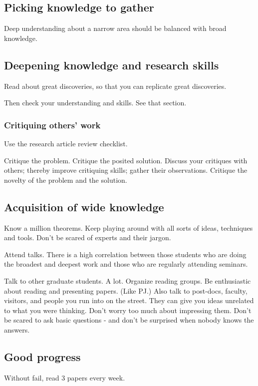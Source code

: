 \documentclass[oneside, article]{memoir}
\begin{document}
\subsection{Picking knowledge to gather}
Deep understanding about a narrow area should be balanced with broad knowledge.

\subsection{Deepening knowledge and research skills}
Read about great discoveries, so that you can replicate great discoveries.

Then check your understanding and skills. See that section.

\subsubsection{Critiquing others' work}
Use the research article review checklist.

\subitem Critique the problem.
\subitem Critique the posited solution.
\subitem Discuss your critiques with others; thereby improve critiquing skills; gather their observations.
\subitem Critique the novelty of the problem and the solution.


\subsection{Acquisition of wide knowledge}
Know a million theorems. Keep playing around with all sorts of ideas, techniques and tools. Don't be scared of experts and their jargon.

Attend talks. There is a high correlation between those students who are doing the broadest and deepest work and those who are regularly attending seminars.

Talk to other graduate students. A lot. Organize reading groups. Be enthusiastic about reading and presenting papers. (Like PJ.) Also talk to post-docs, faculty, visitors, and people you run into on the street. They can give you ideas unrelated to what you were thinking. Don't worry too much about impressing them. Don't be scared to ask basic questions - and don't be surprised when nobody knows the answers.

\subsection{Good progress}
Without fail, read 3 papers every week.
\end{document}
